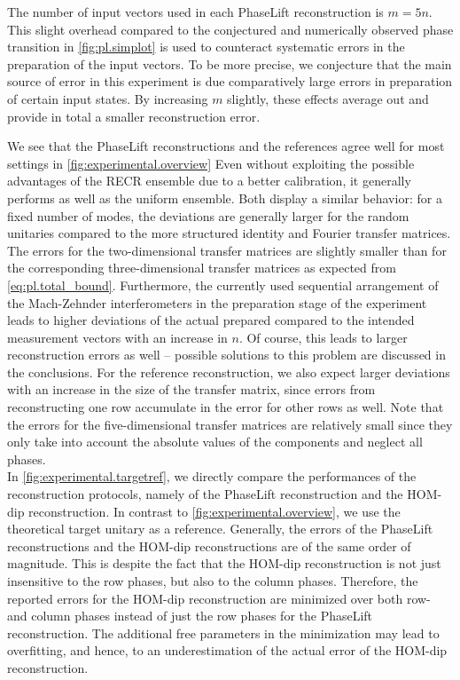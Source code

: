 The number of input vectors used in each PhaseLift reconstruction is $m = 5n$.
This slight overhead compared to the conjectured and numerically observed phase transition in \cref{fig:pl.simplot} is used to counteract systematic errors in the preparation of the input vectors.
To be more precise, we conjecture that the main source of error in this experiment is due comparatively large errors in preparation of certain input states.
By increasing $m$ slightly, these effects average out and provide in total a smaller reconstruction error.

We see that the PhaseLift reconstructions and the references agree well for most settings in \cref{fig:experimental.overview}
Even without exploiting the possible advantages of the RECR ensemble due to a better calibration, it generally performs as well as the uniform ensemble.
Both display a similar behavior: for a fixed number of modes, the deviations are generally larger for the random unitaries compared to the more structured identity and Fourier transfer matrices.
The errors for the two-dimensional transfer matrices are slightly smaller than for the corresponding three-dimensional transfer matrices as expected from \cref{eq:pl.total_bound}.
Furthermore, the currently used sequential arrangement of the Mach-Zehnder interferometers in the preparation stage of the experiment leads to higher deviations of the actual prepared compared to the intended measurement vectors with an increase in $n$.
Of course, this leads to larger reconstruction errors as well -- possible solutions to this problem are discussed in the conclusions.
For the reference reconstruction, we also expect larger deviations with an increase in the size of the transfer matrix, since errors from reconstructing one row accumulate in the error for other rows as well.
Note that the errors for the five-dimensional transfer matrices are relatively small since they only take into account the absolute values of the components and neglect all phases.\\



In \cref{fig:experimental.targetref}, we directly compare the performances of the reconstruction protocols, namely of the PhaseLift reconstruction and the HOM-dip reconstruction.
In contrast to \cref{fig:experimental.overview}, we use the theoretical target unitary as a reference.
Generally, the errors of the PhaseLift reconstructions and the HOM-dip reconstructions are of the same order of magnitude.
This is despite the fact that the HOM-dip reconstruction is not just insensitive to the row phases, but also to the column phases.
Therefore, the reported errors for the HOM-dip reconstruction are minimized over both row- and column phases instead of just the row phases for the PhaseLift reconstruction.
The additional free parameters in the minimization may lead to overfitting, and hence, to an underestimation of the actual error of the HOM-dip reconstruction.\\


